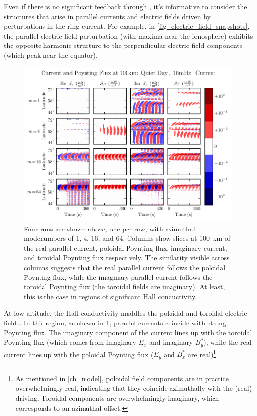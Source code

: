 Even if there is no significant feedback through \farlaw, it's informative to consider the structures that arise in parallel currents and electric fields driven by perturbations in the ring current. For example, in \cref{fig_electric_field_snapshots}, the parallel electric field perturbation (with maxima near the ionosphere) exhibits the opposite harmonic structure to the perpendicular electric field components (which peak near the equator). 

\begin{figure}[!htb]
    \centering
    \includegraphics[width=\textwidth]{figures/slice_100km.pdf}
    \caption[Current and Poynting Flux at \SI{100}{\km}]{
      Four runs are shown above, one per row, with azimuthal modenumbers of 1, 4, 16, and 64. Columns show slices at \SI{100}{\km} of the real parallel current, poloidal Poynting flux, imaginary current, and toroidal Poynting flux respectively. The similarity visible across columns suggests that the real parallel current follows the poloidal Poynting flux, while the imaginary parallel current follows the toroidal Poynting flux (the toroidal fields are imaginary). At least, this is the case in regions of significant Hall conductivity. 
    }
    \label{fig_slice_100km}
\end{figure}

At low altitude, the Hall conductivity muddles the poloidal and toroidal electric fields. In this region, as shown in \cref{fig_slice_100km}, parallel currents coincide with strong Poynting flux. The imaginary component of the current lines up with the toroidal Poynting flux (which comes from imaginary $E_x$ and imaginary $B_y^*$), while the real current lines up with the poloidal Poynting flux ($E_y$ and $B_x^*$ are real)\footnote{As mentioned in \cref{ch_model}, poloidal field components are in practice overwhelmingly real, indicating that they coincide azimuthally with the (real) driving. Toroidal components are overwhelmingly imaginary, which corresponds to an azimuthal offset. }. 

